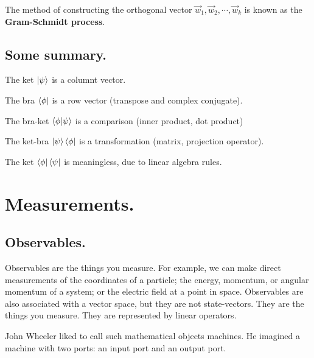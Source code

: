 \documentclass{article}
\begin{document}
The method of constructing the orthogonal vector $\vec{w}_{1}, \vec{w}_{2}, \cdots, \vec{w}_{k}$ is known as the \textbf{Gram-Schmidt process}.



\subsection{Some summary.}

The ket $\ket{\psi}$ is a columnt vector.

The bra $\bra{\phi}$ is a row vector (transpose and complex conjugate).

The bra-ket $\bra{\phi}\ket{\psi}$ is a comparison (inner product, dot product)

The ket-bra $\ket{\psi}\bra{\phi}$ is a transformation (matrix, projection operator).

The ket $\bra{\phi}\bra{\psi}$ is meaningless, due to linear algebra rules.



\section{Measurements.}



\subsection{Observables.}




Observables are the things you measure. For example,
we can make direct measurements of the coordinates of a
particle; the energy, momentum, or angular momentum of a
system; or the electric field at a point in space. Observables
are also associated with a vector space, but they are not
state-vectors. They are the things you measure. They are represented by linear operators.

John Wheeler liked to call such mathematical objects
machines. He imagined a machine with two ports: an input port and an output port.
\end{document}
